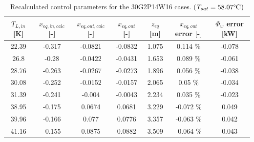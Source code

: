 \begin{table}[!h]
\centering
\begin{tabular}{c|c|c|c|c|c|c}
$T_{L,in}$ {[}K{]} & $x_{eq,in,calc}$ {[}-{]} & $x_{eq,out,calc}$ {[}-{]} & $x_{eq,out}$ {[}-{]} & $z_{eq}$ {[}m{]} & $x_{eq,out}$ error {[}-{]} & $\Phi_{w}$ error {[}kW{]} \\
\hline
\hline
22.39  &  -0.317  &  -0.0821  &  -0.0832  &  1.075  &  0.114 \% &  -0.078 \\
%
26.8  &  -0.28  &  -0.0422  &  -0.0431  &  1.653  &  0.089 \% &  -0.061\\
%
28.76  &  -0.263  &  -0.0267  &  -0.0273  &  1.896  &  0.056 \% &  -0.038\\
%
30.08  &  -0.252  &  -0.0152  &  -0.0157  &  2.065  &  0.05 \% &  -0.034\\
%
31.39  &  -0.241  &  -0.004  &  -0.0043  &  2.234  &  0.035 \% &  -0.023\\
%
38.95  &  -0.175  &  0.0674  &  0.0681  &  3.229  &  -0.072 \% &  0.049\\
%
39.96  &  -0.166  &  0.077  &  0.0776  &  3.357  &  -0.063 \% &  0.042\\
%
41.16  &  -0.155  &  0.0875  &  0.0882  &  3.509  &  -0.064 \% &  0.043
\end{tabular}
\caption{Recalculated control parameters for the 30G2P14W16 cases. ($T_{sat} = 58.07\degree\mathrm{C}$)}
\label{tab:xout_30P14_recalc}
\end{table}


